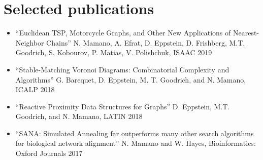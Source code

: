 \documentclass[letterpaper,10pt,oneside]{article}
\begin{document}

\section*{Selected publications}
\begin{itemize}[leftmargin=15px]
\item ``Euclidean TSP, Motorcycle Graphs, and Other New Applications of Nearest-Neighbor Chains'' N. Mamano, A. Efrat, D. Eppstein, D. Frishberg, M.T. Goodrich, S. Kobourov, P. Matias, V. Polishchuk, ISAAC 2019
\item ``Stable-Matching Voronoi Diagrams: Combinatorial Complexity and Algorithms'' G. Barequet, D. Eppstein, M. T. Goodrich, and N. Mamano, ICALP 2018
\item ``Reactive Proximity Data Structures for Graphs'' D. Eppstein, M.T. Goodrich, and N. Mamano, LATIN 2018
\item ``SANA: Simulated Annealing far outperforms many other search algorithms for biological network alignment'' N. Mamano and W. Hayes, Bioinformatics: Oxford Journals 2017\\
\end{itemize}
\end{document}

